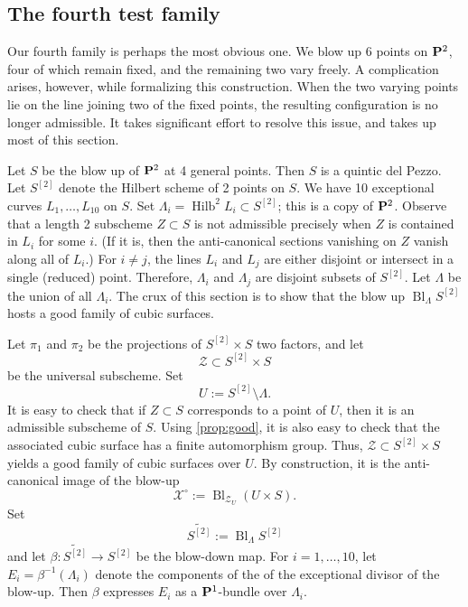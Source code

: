 \documentclass[12pt,reqno]{amsart}
\DeclareMathOperator{\Bl}{Bl}
\DeclareMathOperator{\Hilb}{Hilb}
\renewcommand{\to}{{\longrightarrow}}
\numberwithin{equation}{section}
\newcommand{\cX}{\mathcal{X}}
\begin{document}
\subsection{The fourth test family}
\label{sec:family-b_4}
Our fourth family is perhaps the most obvious one.
We blow up 6 points on $\P^2$, four of which remain fixed, and the remaining two vary freely.
A complication arises, however, while formalizing this construction.
When the two varying points lie on the line joining two of the fixed points, the resulting configuration is no longer admissible.
It takes significant effort to resolve this issue, and takes up most of this section.

Let $S$ be the blow up of $\P^2$ at 4 general points.
Then $S$ is a quintic del Pezzo. 
Let $S^{[2]}$ denote the Hilbert scheme of 2 points on $S$.
We have 10 exceptional curves $L_1, \dots, L_{10}$ on $S$.
Set $\Lambda_i = \Hilb^2 L_i \subset S^{[2]}$; this is a copy of $\P^2$.
Observe that a length 2 subscheme $Z \subset S$ is not admissible precisely when $Z$ is contained in $L_i$ for some $i$.
(If it is, then the anti-canonical sections vanishing on $Z$ vanish along all of $L_i$.)
For $i \neq j$, the lines $L_i$ and $L_j$ are either disjoint or intersect in a single (reduced) point.
Therefore, $\Lambda_i$ and  $\Lambda_j$ are disjoint subsets of $S^{[2]}$.
Let $\Lambda$ be the union of all $\Lambda_i$.
The crux of this
section is to show that the blow up $\Bl_{\Lambda}S^{[2]}$ hosts a
good family of cubic surfaces.

Let $\pi_{1}$ and $\pi_{2}$ be the projections of $S^{[2]} \times S$
two factors, and let
\[\mathcal{Z} \subset S^{[2]} \times S\]
be the universal subscheme. 
Set
\begin{equation} 
  \label{eq:UB3}
  U := S^{[2]} \setminus \Lambda.
\end{equation}
It is easy to check that if $Z \subset S$ corresponds to a point of $U$, then it is an admissible subscheme of $S$.
Using \autoref{prop:good}, it is also easy to check that the associated cubic surface has a finite automorphism group.
Thus, $\mathcal Z \subset S^{[2]} \times S$ yields a good family of cubic surfaces over $U$.
By construction, it is the anti-canonical image of the blow-up
\begin{equation}
  \label{eq:XUB3}
  \cX^{\circ} := \Bl_{\mathcal{Z}_{U}}(U \times S).
\end{equation}
Set
\begin{equation}
  \label{eq:S2tilde}
  \widetilde {S^{[2]}} := \Bl_{\Lambda}S^{[2]}
\end{equation}
and let $\beta \colon \widetilde {S^{[2]}} \to S^{[2]}$ be the blow-down map.
For $i=1, \dots, 10$, let $E_{i} = \beta^{-1}(\Lambda_{i})$ denote the
components of the of the exceptional divisor of the blow-up.
Then $\beta$ expresses $E_{i}$ as a $\P^{1}$-bundle over $\Lambda_{i}$.
\end{document}
